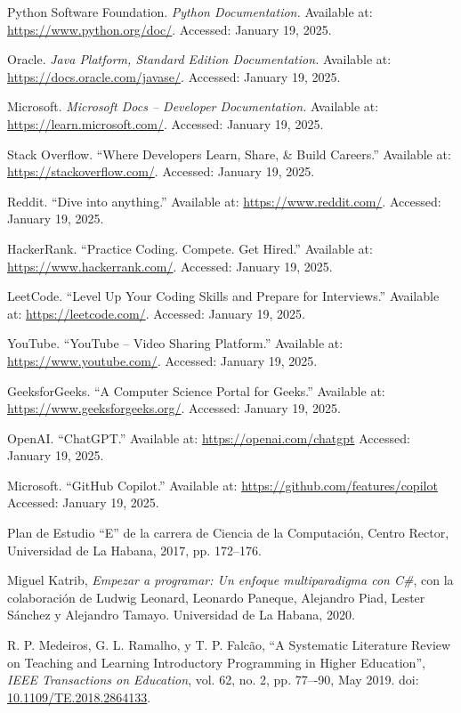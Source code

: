 \documentclass{article}
\begin{document}
\begin{thebibliography}{99}
Python Software Foundation. \textit{Python Documentation.} Available at: \url{https://www.python.org/doc/}. Accessed: January 19, 2025.

Oracle. \textit{Java Platform, Standard Edition Documentation.} Available at: \url{https://docs.oracle.com/javase/}. Accessed: January 19, 2025.

Microsoft. \textit{Microsoft Docs – Developer Documentation.} Available at: \url{https://learn.microsoft.com/}. Accessed: January 19, 2025.

Stack Overflow. ``Where Developers Learn, Share, \& Build Careers.'' Available at: \url{https://stackoverflow.com/}. Accessed: January 19, 2025.

Reddit. ``Dive into anything.'' Available at: \url{https://www.reddit.com/}. Accessed: January 19, 2025.

HackerRank. ``Practice Coding. Compete. Get Hired.'' Available at: \url{https://www.hackerrank.com/}. Accessed: January 19, 2025.

LeetCode. ``Level Up Your Coding Skills and Prepare for Interviews.'' Available at: \url{https://leetcode.com/}. Accessed: January 19, 2025.

YouTube. ``YouTube – Video Sharing Platform.'' Available at: \url{https://www.youtube.com/}. Accessed: January 19, 2025.

GeeksforGeeks. ``A Computer Science Portal for Geeks.'' Available at: \url{https://www.geeksforgeeks.org/}. Accessed: January 19, 2025.

OpenAI. ``ChatGPT.'' Available at: \url{https://openai.com/chatgpt} Accessed: January 19, 2025.

Microsoft. ``GitHub Copilot.'' Available at: \url{https://github.com/features/copilot} Accessed: January 19, 2025.

Plan de Estudio ``E'' de la carrera de Ciencia de la Computación, Centro Rector, Universidad de La Habana, 2017, pp. 172--176.

Miguel Katrib, \textit{Empezar a programar: Un enfoque multiparadigma con C\#}, con la colaboración de Ludwig Leonard, Leonardo Paneque, Alejandro Piad, Lester Sánchez y Alejandro Tamayo. Universidad de La Habana, 2020.

R. P. Medeiros, G. L. Ramalho, y T. P. Falcão,  
``A Systematic Literature Review on Teaching and Learning Introductory Programming in Higher Education'',
\textit{IEEE Transactions on Education}, vol. 62, no. 2, pp. 77–-90, May 2019.  
doi: \href{https://doi.org/10.1109/TE.2018.2864133}{10.1109/TE.2018.2864133}.


\end{thebibliography}
\end{document}
